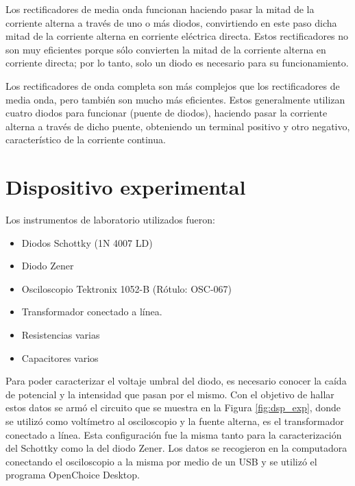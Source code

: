\documentclass[twoside,twocolumn,a4paper]{article}
\begin{document}
Los rectificadores de media onda funcionan haciendo pasar la mitad de la corriente alterna a trav\'es de uno o m\'as diodos, convirtiendo en este paso dicha mitad de la corriente alterna en corriente el\'ectrica directa. Estos rectificadores no son muy eficientes porque s\'olo convierten la mitad de la corriente alterna en corriente directa; por lo tanto, solo un diodo es necesario para su funcionamiento.\par

Los rectificadores de onda completa son m\'as complejos que los rectificadores de media onda, pero tambi\'en son mucho m\'as eficientes. Estos generalmente utilizan cuatro diodos para funcionar (puente de diodos), haciendo pasar la corriente alterna a trav\'es de dicho puente, obteniendo un terminal positivo y otro negativo, caracter\'istico de la corriente continua.



\section{Dispositivo experimental}
Los instrumentos de laboratorio utilizados fueron:
\begin{itemize}
\item 
\label{diodo} Diodos Schottky (1N 4007 LD)%
\item 
\label{zener} Diodo Zener
\item 
\label{osc} Osciloscopio Tektronix 1052-B (R\'otulo: OSC-067) %
\item
\label{trans} Transformador conectado a l\'inea. 
\item Resistencias varias
\item Capacitores varios
\end{itemize}

Para poder caracterizar el voltaje umbral del diodo, es necesario conocer la ca\'ida de potencial y la intensidad que pasan por el mismo. Con el objetivo de hallar estos datos se arm\'o el circuito que se muestra en la Figura \ref{fig:dsp_exp}, donde se utiliz\'o como volt\'imetro al osciloscopio y la fuente alterna, es el transformador conectado a l\'inea. Esta configuraci\'on fue la misma tanto para la caracterizaci\'on del Schottky como la del diodo Zener. Los datos se recogieron en la computadora conectando el osciloscopio a la misma por medio de un USB y se utiliz\'o el programa OpenChoice Desktop. 
\end{document}
